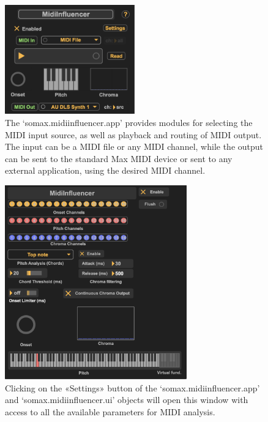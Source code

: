 \begin{figure}[H]
    \centering        
 	\includegraphics[width=0.5\textwidth, keepaspectratio]{img/midiinfluencer_app.png}
    \caption{The `somax.midiinfluencer.app' provides modules for selecting the MIDI input source, as well as playback and routing of MIDI output. The input can be a MIDI file or any MIDI channel, while the output can be sent to the standard Max MIDI device or sent to any external application, using the desired MIDI channel.}
    \label{fig:midiinfluencer_app}
\end{figure}



 \begin{figure}[H]
    \centering        
 	\includegraphics[width=0.7\textwidth, keepaspectratio]{img/midiinfluencer_settings.png}
    \caption{Clicking on the «Settings» button of the `somax.midiinfluencer.app' and `somax.midiinfluencer.ui' objects will open this window with access to all the available parameters for MIDI analysis.}
    \label{fig:midiinfluencer_settings}
\end{figure}

